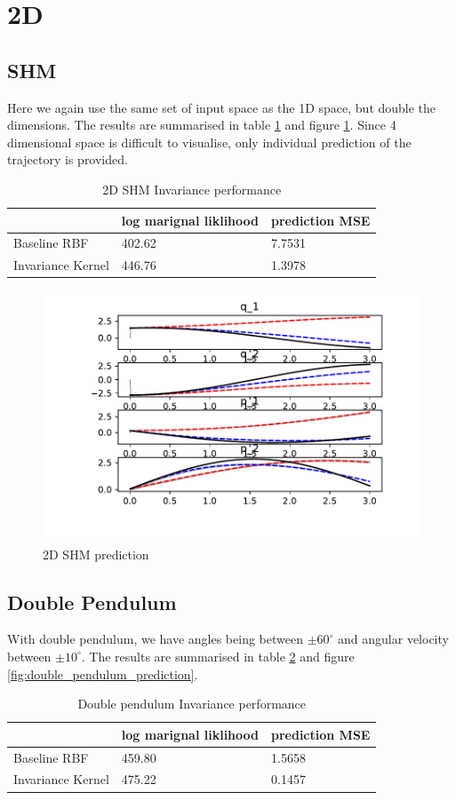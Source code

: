 \documentclass{statsmsc}
\begin{document}
\section{2D}
\subsection{SHM}
Here we again use the same set of input space as the 1D space, but double the dimensions. 
The results are summarised in table \ref{tab:SHM_2d_performance} and figure \ref{fig:shm_2d_prediction}.
Since 4 dimensional space is difficult to visualise, only individual prediction of the trajectory is provided. 
\begin{table}[H]
  \centering
  \begin{tabular}{l l l }
    \hline
                    & log marignal liklihood &  prediction MSE  \\
    \hline
Baseline RBF & 402.62 & 7.7531 \\
Invariance Kernel & 446.76 & 1.3978 \\
    \hline
  \end{tabular}
  \caption{2D SHM Invariance performance}
  \label{tab:SHM_2d_performance}
\end{table}

\begin{figure}[H] 
  \includegraphics[width=0.6\linewidth]{../codes/figures/shm_2d_predicted_trajectory.pdf}
  \centering
  \caption{2D SHM prediction}
  \label{fig:shm_2d_prediction}
\end{figure}

\subsection{Double Pendulum}
With double pendulum, we have angles being between $\pm 60^\circ$ and angular velocity between $\pm 10^\circ$.
The results are summarised in table \ref{tab:double_pendulum_performance} and figure \ref{fig:double_pendulum_prediction}.
\begin{table}[H]
  \centering
  \begin{tabular}{l l l }
    \hline
                    & log marignal liklihood &  prediction MSE  \\
    \hline
Baseline RBF & 459.80 & 1.5658 \\
Invariance Kernel & 475.22 & 0.1457 \\
    \hline
  \end{tabular}
  \caption{Double pendulum Invariance performance}
  \label{tab:double_pendulum_performance}
\end{table}
\end{document}
